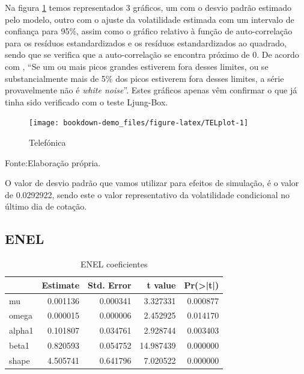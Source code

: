 \documentclass[
  12pt,
  a4paper,
  openany]{book}
\begin{document}
Na figura \ref{fig:TELplot} temos representados 3 gráficos, um com o desvio padrão estimado pelo modelo, outro com o ajuste da volatilidade estimada com um intervalo de confiança para 95\%, assim como o gráfico relativo à função de auto-correlação para os resíduos estandardizados e os resíduos estandardizados ao quadrado, sendo que se verifica que a auto-correlação se encontra próximo de 0. De acordo com \citet{foregeorge}, ``Se um ou mais picos grandes estiverem fora desses limites, ou se substancialmente mais de 5\% dos picos estiverem fora desses limites, a série provavelmente não é \emph{white noise}''. Estes gráficos apenas vêm confirmar o que já tinha sido verificado com o teste Ljung-Box.

\begin{figure}

{\centering \texttt{[image: bookdown-demo\_files/figure-latex/TELplot-1]} 

}

\caption{Telefónica}\label{fig:TELplot}
\end{figure}
\FloatBarrier
\centering

Fonte:Elaboração própria.

\justifying
\bigskip

O valor de desvio padrão que vamos utilizar para efeitos de simulação, é o valor de 0.0292922, sendo este o valor representativo da volatilidade condicional no último dia de cotação.

\hypertarget{enel}{%
\subsection{ENEL}\label{enel}}

\begin{table}[!h]

\caption{\label{tab:unnamed-chunk-23}ENEL coeficientes}
\centering
\begin{tabular}[t]{lrrrr}
\toprule
  &  Estimate &  Std. Error &  t value & Pr(>|t|)\\
\midrule
mu & 0.001136 & 0.000341 & 3.327331 & 0.000877\\
omega & 0.000015 & 0.000006 & 2.452925 & 0.014170\\
alpha1 & 0.101807 & 0.034761 & 2.928744 & 0.003403\\
beta1 & 0.820593 & 0.054752 & 14.987439 & 0.000000\\
shape & 4.505741 & 0.641796 & 7.020522 & 0.000000\\
\bottomrule
\end{tabular}
\end{table}
\FloatBarrier
\centering
\end{document}
